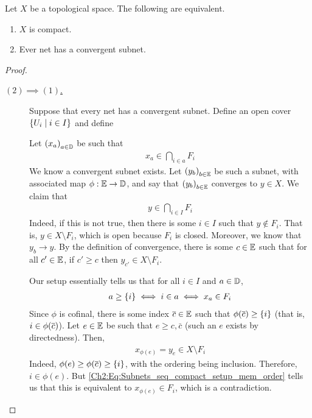 \begin{boxtheorem}
    Let $X$ be a topological space. The following are equivalent.
    \begin{enumerate}[label = (\arabic*)]
        \item $X$ is compact.
        \item Ever net has a convergent subnet.
    \end{enumerate}
\end{boxtheorem}
\begin{proof} \hfill
    \begin{description}
        \item[\underline{$(2) \implies (1)$.}]
        Suppose that every net has a convergent subnet. Define an open cover $\left\{ U_i \; \middle\vert \; i \in I \right\}$ and define \sorry %

        Let $\left( x_a \right)_{a \in \mathbb{D}}$ be such that
        \begin{align*}
            x_a \in \bigcap_{i \in a} F_i
        \end{align*}
        We know a convergent subnet exists. Let $\left( y_b \right)_{b \in \mathbb{E}}$ be such a subnet, with associated map $\phi : \mathbb{E} \to \mathbb{D}$, and say that $\left( y_b \right)_{b \in \mathbb{E}}$ converges to $y \in X$. We claim that
        \begin{align*}
            y \in \bigcap_{i \in I} F_i
        \end{align*}
        Indeed, if this is not true, then there is some $i \in I$ such that $y \notin F_i$. That is, $y \in X \setminus F_i$, which is open because $F_i$ is closed. Moreover, we know that $y_b \to y$. By the definition of convergence, there is some $c \in \mathbb{E}$ such that for all $c' \in \mathbb{E}$, if $c' \geq c$ then $y_{c'} \in X \setminus F_i$.

        Our setup essentially tells us that for all $i \in I$ and $a \in \mathbb{D}$,
        \begin{align}
            a \geq \left\{ i \right\} \iff i \in a \iff x_a \in F_i
            \label{Ch2:Eq:Subnets_seq_compact_setup_mem_order}
        \end{align}
        Since $\phi$ is cofinal, there is some index $\overline{c} \in \mathbb{E}$ such that $\phi\!\left( \overline{c} \right) \geq \left\{ i \right\}$ (that is, $i \in \phi\!\left( \overline{c} \right)$). Let $e \in \mathbb{E}$ be such that $e \geq c, \bar{c}$ (such an $e$ exists by directedness). Then,
        \begin{align*}
            x_{\phi(e)} = y_e \in X \setminus F_i
        \end{align*}
        Indeed, $\phi(e) \geq \phi\!\left( \overline{c} \right) \geq \left\{ i \right\}$, with the ordering being inclusion. Therefore, $i \in \phi(e)$. But \eqref{Ch2:Eq:Subnets_seq_compact_setup_mem_order} tells us that this is equivalent to $x_{\phi(e)} \in F_i$, which is a contradiction.


\end{description}
\end{proof}
